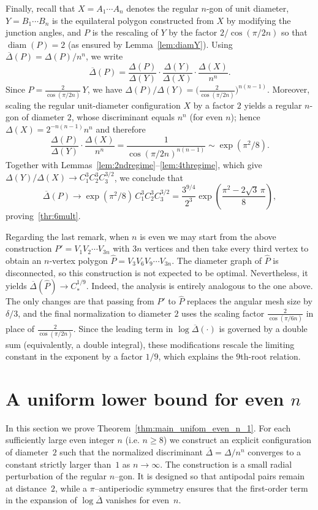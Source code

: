 \documentclass{article}
\DeclareMathOperator{\diam}{diam}
\theoremstyle{definition}
\let\geq\geqslant
\newcommand*{\oD}{\overline \Delta}
\newcounter{row}
\begin{document}
Finally, recall that $X=A_1\cdots A_n$ denotes the regular $n$-gon of unit diameter,
$Y=B_1\cdots B_n$ is the equilateral polygon constructed from $X$ by modifying the junction angles,
and $P$ is the rescaling of $Y$ by the factor $2/\cos(\pi/2n)$ so that $\diam(P)=2$ (as ensured by Lemma~\ref{lem:diamY}).
Using $\oD(P)=\Delta(P)/n^n$, we write
\[
\oD(P)=\frac{\Delta(P)}{\Delta(Y)}\cdot\frac{\Delta(Y)}{\Delta(X)}\cdot\frac{\Delta(X)}{n^n}.
\]
Since $P=\frac{2}{\cos(\pi/2n)}\,Y$, we have
$\Delta(P)/\Delta(Y)=\bigl(\frac{2}{\cos(\pi/2n)}\bigr)^{n(n-1)}$.
Moreover, scaling the regular unit-diameter configuration $X$ by a factor $2$ yields a regular
$n$-gon of diameter $2$, whose discriminant equals $n^n$ (for even $n$); hence
$\Delta(X)=2^{-n(n-1)}n^n$ and therefore
\[
\frac{\Delta(P)}{\Delta(Y)}\cdot\frac{\Delta(X)}{n^n}
=\frac{1}{\cos(\pi/2n)^{n(n-1)}}
\sim \exp(\pi^2/8).
\]
Together with Lemmas~\ref{lem:2ndregime}--\ref{lem:4thregime}, which give
$\Delta(Y)/\Delta(X)\to C_1^3C_2^3C_3^{3/2}$, we conclude that
\[
\oD(P)\to \exp(\pi^2/8)\,C_1^3C_2^3C_3^{3/2}
=\frac{3^{9/4}}{2^3}\exp\!\left(\frac{\pi^2-2\sqrt3\,\pi}{8}\right),
\]
proving~\cref{thr:6mult}.










Regarding the last remark, when $n$ is even we may start from the above construction
$P'=V_1V_2\cdots V_{3n}$ with $3n$ vertices and then take every third vertex to obtain an
$n$-vertex polygon \(\widehat{P}=V_3V_6V_9\cdots V_{3n}\). The diameter graph of $\widehat{P}$ is disconnected, so this construction is not expected to be optimal.
Nevertheless, it yields \(\oD(\widehat{P})\longrightarrow C_*^{1/9}\). Indeed, the analysis is entirely analogous to the one above. The only changes are that passing from
$P'$ to $\widehat{P}$ replaces the angular mesh size by $\delta/3$, and the final normalization to diameter
$2$ uses the scaling factor $\frac{2}{\cos(\pi/6n)}$ in place of $\frac{2}{\cos(\pi/2n)}$.
Since the leading term in $\log \oD(\cdot)$ is governed by a double sum (equivalently, a double integral),
these modifications rescale the limiting constant in the exponent by a factor $1/9$, which explains the
$9$th-root relation.








\section{A uniform lower bound for even $n$}\label{sec:unif_lower_bnd}
In this section we prove Theorem~\ref{thm:main_unifom_even_n_1}.
For each sufficiently large even integer $n$ (i.e. \(n\geq8\)) we construct an explicit configuration of diameter~$2$
such that the normalized discriminant $\oD=\Delta/n^n$ converges to a constant strictly larger than~$1$ as $n\to\infty$.
The construction is a small radial perturbation of the regular $n$--gon.
It is designed so that antipodal pairs remain at distance~$2$,
while a $\pi$--antiperiodic symmetry ensures that the first-order term in the expansion of $\log \oD$ vanishes for even~$n$.
\end{document}
